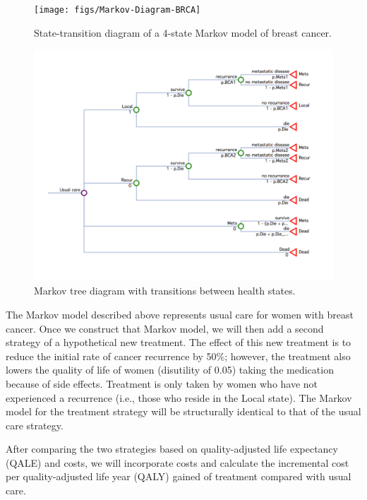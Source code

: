 \documentclass[]{article}
\theoremstyle{definition}
\theoremstyle{definition}
\theoremstyle{definition}
\theoremstyle{remark}
\begin{document}
\begin{figure}[H]

{\centering \texttt{[image: figs/Markov-Diagram-BRCA]} 

}

\caption{State-transition diagram of a 4-state Markov model of breast cancer.}\label{fig:state-transition-diag}
\end{figure}

\begin{figure}[H]

{\centering \includegraphics{figs/Markov-tree-BRCA} 

}

\caption{Markov tree diagram with transitions between health states.}\label{fig:Markov-tree-diag}
\end{figure}

The Markov model described above represents usual care for women with
breast cancer. Once we construct that Markov model, we will then add a
second strategy of a hypothetical new treatment. The effect of this new
treatment is to reduce the initial rate of cancer recurrence by 50\%;
however, the treatment also lowers the quality of life of women
(disutility of 0.05) taking the medication because of side effects.
Treatment is only taken by women who have not experienced a recurrence
(i.e., those who reside in the Local state). The Markov model for the
treatment strategy will be structurally identical to that of the usual
care strategy.

After comparing the two strategies based on quality-adjusted life
expectancy (QALE) and costs, we will incorporate costs and calculate the
incremental cost per quality-adjusted life year (QALY) gained of
treatment compared with usual care.
\end{document}
